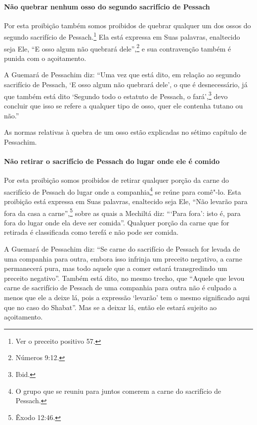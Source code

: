 \begin{multicols}{2}
\paragraph{Não quebrar nenhum osso do segundo sacrifício de Pessach\starr{}}

Por esta proibição também somos proibidos de quebrar qualquer um dos
ossos do segundo sacrifício de Pessach\starr.\footnote{Ver o preceito positivo 57.} Ela
está expressa em Suas palavras, enaltecido seja Ele, ``E osso algum não
quebrará dele'',\footnote{Números 9:12.} e sua contravenção também é punida com o
açoitamento.

A Guemará\starr{} de Pessachim\starr{} diz: ``Uma vez que está dito, em relação ao
segundo sacrifício de Pessach\starr, `E osso algum não quebrará dele', o que
é desnecessário, já que também está dito `Segundo todo o estatuto de
Pessach\starr, o fará',\footnote{Ibid.} devo concluir que isso se refere a qualquer
tipo de osso, quer ele contenha tutano ou não.''

As normas relativas à quebra de um osso estão explicadas no sétimo
capítulo de Pessachim\starr.

\paragraph{Não retirar o sacrifício de Pessach\starr{} do lugar onde ele é comido}

Por esta proibição somos proibidos de retirar qualquer porção da carne
do sacrifício de Pessach\starr{} do lugar onde a
companhia\footnote{O grupo que se reuniu para juntos comerem a carne do sacrifício de
  Pessach\starr.} se reúne para comê"-lo. Esta proibição
está expressa em Suas palavras, enaltecido seja Ele, ``Não levarão para
fora da casa a carne'',\footnote{Êxodo 12:46.} sobre as quais a Mechiltá\starr{} diz:
```Para fora': isto é, para fora do lugar onde ela deve ser comida''.
Qualquer porção da carne que for retirada é classificada como terefá\starr{}
e não pode ser comida.

A Guemará\starr{} de Pessachim\starr{} diz: ``Se carne do sacrifício de Pessach\starr{} for
levada de uma companhia para outra, embora isso
infrinja um preceito negativo, a carne permanecerá pura, mas todo aquele
que a comer estará transgredindo um preceito negativo''. Também está
dito, no mesmo trecho, que ``Aquele que levou carne de sacrifício de
Pessach\starr{} de uma companhia para outra não é
culpado a menos que ele a deixe lá, pois a expressão `levarão' tem o
mesmo significado aqui que no caso do Shabat''. Mas se a deixar lá,
então ele estará sujeito ao açoitamento.


\end{multicols}
